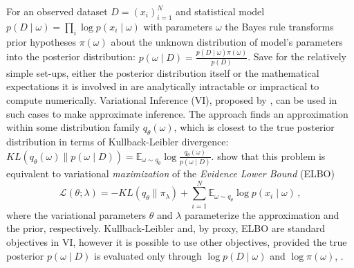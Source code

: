 \documentclass[a4paper,10pt,twocolumn]{article}
\begin{document}
For an observed dataset $
  D = (x_i)_{i=1}^N
$ and statistical model $
  p(D \mid \omega)
    = \prod_i \log p(x_i \mid \omega)
$ with parameters $\omega$ the Bayes rule transforms prior hypotheses $\pi(\omega)$
about the unknown distribution of model's parameters into the posterior distribution: $
  p(\omega \mid D) = \tfrac{p(D \mid \omega) \pi(\omega)}{p(D)}
$.
%
Save for the relatively simple set-ups, either the posterior distribution itself or the
mathematical expectations it is involved in are analytically intractable or impractical
to compute numerically. Variational Inference (VI), proposed by \citet{jordan_introduction_1999},
can be used in such cases to make approximate inference. The approach finds an approximation
within some distribution family $q_\theta(\omega)$, which is closest to the true posterior
distribution in terms of Kullback-Leibler divergence: $
  KL(q_\theta(\omega) \| p(\omega \mid D))
    = \mathbb{E}_{\omega \sim q_\theta}
      \log \tfrac{q_\theta(\omega)}{p(\omega \mid D)}
$. %
%
\citet{jordan_introduction_1999} show that this problem is equivalent to variational
\emph{maximization} of the \emph{Evidence Lower Bound} (ELBO)
\begin{equation}  \label{eq:elbo_general}
  \mathcal{L}(\theta; \lambda)
    = - KL(q_{\theta} \| \pi_{\lambda})
      + \sum_{i=1}^N \mathbb{E}_{\omega \sim q_{\theta}}
        \log p(x_i \mid \omega)
  \,,
\end{equation}
where the variational parameters $\theta$ and $\lambda$ parameterize the approximation
and the prior, respectively.
%
Kullback-Leibler and, by proxy, ELBO are standard objectives in VI, however it is possible
to use other objectives, provided the true posterior $p(\omega \mid D)$ is evaluated only
through $\log p(D \mid \omega)$ and $\log \pi(\omega)$, \citep{ranganath_operator_2018}.
\end{document}
